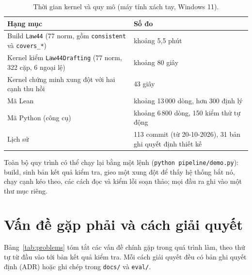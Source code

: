 \documentclass[12pt,a4paper]{article}
\newcommand{\code}[1]{\texttt{#1}}
\begin{document}
\begin{table}[H]
\centering\small
\caption{Thời gian kernel và quy mô (máy tính xách tay, Windows 11).}
\begin{tabularx}{\textwidth}{>{\raggedright\arraybackslash}p{7.4cm}L}
\toprule
Hạng mục & Số đo\\
\midrule
Build \code{Law44} (77 norm, gồm \code{consistent} và \code{covers\_*}) & khoảng 5,5 phút\\
Kernel kiểm \code{Law44Drafting} (77 norm, 322 cặp, 6 ngoại lệ) & khoảng 80 giây\\
Kernel chứng minh xung đột với hai cạnh thu hồi & 43 giây\\
Mã Lean & khoảng 13\,000 dòng, hơn 300 định lý\\
Mã Python (công cụ) & khoảng 6\,800 dòng, 150 kiểm thử tự động\\
Lịch sử & 113 commit (từ 20-10-2026), 31 bản ghi quyết định thiết kế\\
\bottomrule
\end{tabularx}
\end{table}

Toàn bộ quy trình có thể chạy lại bằng một lệnh (\code{python pipeline/demo.py}): build, sinh bản kết quả kiểm tra, gieo một xung đột để
thấy hệ thống bắt nó, chạy cạnh kéo theo, các cách đọc và kiểm lỗi soạn thảo; mọi đầu ra ghi vào một thư mục riêng.

\section{Vấn đề gặp phải và cách giải quyết}

Bảng~\ref{tab:problems} tóm tắt các vấn đề chính gặp trong quá trình làm, theo thứ tự từ đầu vào tới bản kết quả kiểm tra. Mỗi cách giải
quyết đều có bản ghi quyết định (ADR) hoặc ghi chép trong \code{docs/} và \code{eval/}.
\end{document}
